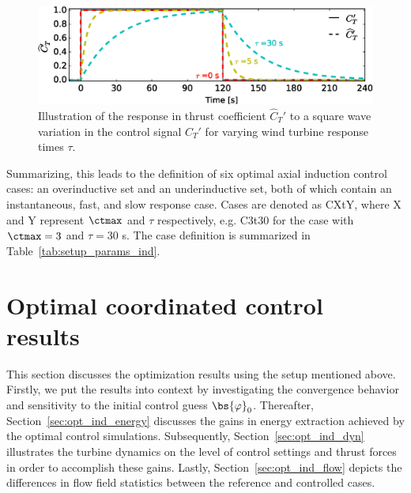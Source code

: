 \begin{figure}[t]
	\centering
	\includegraphics[width=\textwidth]{chapters/optimal_control_problem/figure3_bw.eps}    
	\caption{Illustration of the response in thrust coefficient $\widehat{C}_T'$ to a square wave variation in the control signal $C_T'$ for varying wind turbine response times $\tau$. \label{fig:cthat_ind}}
\end{figure}
 
Summarizing, this leads to the definition of six optimal axial induction control cases: an overinductive set and an underinductive set, both of which contain an instantaneous, fast, and slow response case. Cases are denoted as CXtY, where X and Y represent $\ctmax$ and $\tau$ respectively, e.g. C3t30 for the case with $\ctmax=3$ and $\tau=30$ s. The case definition is summarized in Table~\ref{tab:setup_params_ind}.



\section{Optimal coordinated control results}\label{sec:opt_ind_results}
This section discusses the optimization results using the setup mentioned above. Firstly, we put the results into context by investigating the convergence behavior and sensitivity to the initial control guess $\bs{\varphi}_0$. Thereafter, Section~\ref{sec:opt_ind_energy} discusses the gains in energy extraction achieved by the optimal control simulations. Subsequently, Section~\ref{sec:opt_ind_dyn} illustrates the turbine dynamics on the level of control settings and thrust forces in order to accomplish these gains. Lastly, Section~\ref{sec:opt_ind_flow} depicts the differences in flow field statistics between the reference and controlled cases.

